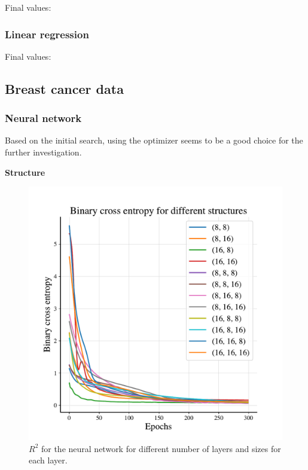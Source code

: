Final values: 



\subsubsection{Linear regression}

Final values: 

\subsection{Breast cancer data}

\subsubsection{Neural network}


Based on the initial search, using the  optimizer seems to be a good choice for the further investigation.

\textbf{Structure}

\begin{figure}
    \centering
    \includegraphics[width=1.0\linewidth]{project_2/figures/Binary cross entropy for different structures_classification.pdf}
    \caption{$R^2$ for the neural network for different number of layers and sizes for each layer.}
    \label{fig:structure_cancer}
\end{figure}

